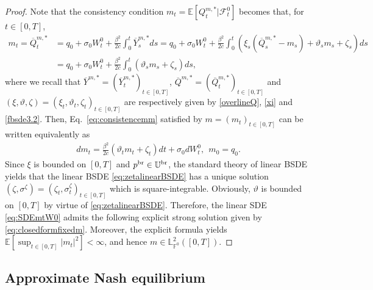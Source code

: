 \documentclass[11pt]{article}
\numberwithin{equation}{section}
\begin{document}
\begin{proof}
Note that the consistency condition $m_t=\mathbb{E}[Q_t^{m, *}|\mathcal{F}_t^0]$ becomes that, for $t\in[0,T]$,
\begin{align}\label{eq:consistencemm}
m_t =\overline{Q}_t^{m,*}&=q_0+\sigma_0W_t^{0} + \frac{\beta^2}{2c}\int_0^t\overline{Y}_s^{m, *}ds= q_0+\sigma_0W_t^{0} + \frac{\beta^2}{2c}\int_0^t\left(\xi_s(\overline{Q}_s^{m, *}-m_s)+\vartheta_sm_s+\zeta_s\right)ds\nonumber\\
&= q_0+\sigma_0W_t^{0} + \frac{\beta^2}{2c}\int_0^t\left(\vartheta_sm_s+\zeta_s\right)ds,
\end{align}
where we recall that $\overline{Y}^{m,*}=(\overline{Y}_t^{m,*})_{t\in[0,T]}$, $\overline{Q}^{m,*}=(\overline{Q}_t^{m,*})_{t\in[0,T]}$ and $(\xi,\vartheta,\zeta)=(\xi_t,\vartheta_t,\zeta_t)_{t\in[0,T]}$ are respectively given by \eqref{overlineQ}, \eqref{xi} and \eqref{fbsde3.2}. Then, Eq.~\eqref{eq:consistencemm} satisfied by $m=(m_t)_{t\in[0,T]}$ can be written equivalently as
\begin{align}\label{eq:SDEmtW0}
dm_t=\frac{\beta^2}{2c}\left(\vartheta_tm_t+\zeta_t\right)dt+\sigma_0dW_t^0, ~~m_0=q_0.   
\end{align}
Since $\xi$ is bounded on $[0, T]$ and $p^{{\rm br}}\in \mathbb{U}^{{\rm br}}$, the standard theory of linear BSDE yields that the linear BSDE \eqref{eq:zetalinearBSDE} has a unique solution $(\zeta, \sigma^{\zeta})=(\zeta_t, \sigma_t^{\zeta})_{t\in[0,T]}$ which is square-integrable. Obviously, $\vartheta$ is bounded on $[0,T]$ by virtue of \eqref{eq:zetalinearBSDE}. Therefore, the linear SDE \eqref{eq:SDEmtW0} admits the following explicit strong solution given by \eqref{eq:closedformfixedm}. Moreover, the explicit formula yields $\mathbb{E}[\sup_{t\in [0,T]}|m_t|^2]<\infty$, and hence $m\in \mathbb{L}_{\mathbb{F}^0}^2([0,T])$.
\end{proof} 
        

\subsection{Approximate Nash equilibrium}
\end{document}
